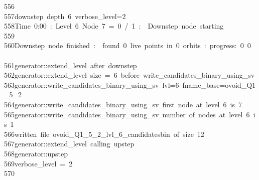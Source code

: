\begin{tabbing}
556\>\\[0pt]
557\>downstep\ depth\ 6\ verbose\_level=2\\[0pt]
558\>Time\ 0:00\ :\ Level\ 6\ Node\ 7\ =\ 0\ /\ 1\ :\ \ Downstep\ node\ starting\\[0pt]
559\>\\[0pt]
560\>Downstep\ node\ finished\ :\ \ found\ 0\ live\ points\ in\ 0\ orbits\ :\ progress:\ 0\ 0\ \ \\[0pt]
561\>generator::extend\_level\ after\ downstep\\[0pt]
562\>generator::extend\_level\ size\ =\ 6\ before\ write\_candidates\_binary\_using\_sv\\[0pt]
563\>generator::write\_candidates\_binary\_using\_sv\ lvl=6\ fname\_base=ovoid\_Q1\_5\_2\\[0pt]
564\>generator::write\_candidates\_binary\_using\_sv\ first\ node\ at\ level\ 6\ is\ 7\\[0pt]
565\>generator::write\_candidates\_binary\_using\_sv\ number\ of\ nodes\ at\ level\ 6\ is\ 1\\[0pt]
566\>written\ file\ ovoid\_Q1\_5\_2\_lvl\_6\_candidatesbin\ of\ size\ 12\\[0pt]
567\>generator::extend\_level\ calling\ upstep\\[0pt]
568\>generator::upstep\\[0pt]
569\>verbose\_level\ =\ 2\\[0pt]
570\>\\[0pt]

\end{tabbing}
